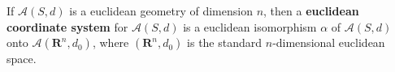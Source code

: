 If $\mathcal{A}(S, d)$ is a euclidean geometry of dimension $n$, then a \textbf{euclidean coordinate system} for $\mathcal{A}(S, d)$ is a euclidean isomorphism $\alpha$ of $\mathcal{A}(S, d)$ onto $\mathcal{A}(\mathbf{R}^n, d_0)$, where $(\mathbf{R}^n, d_0)$ is the standard $n$-dimensional euclidean space.
